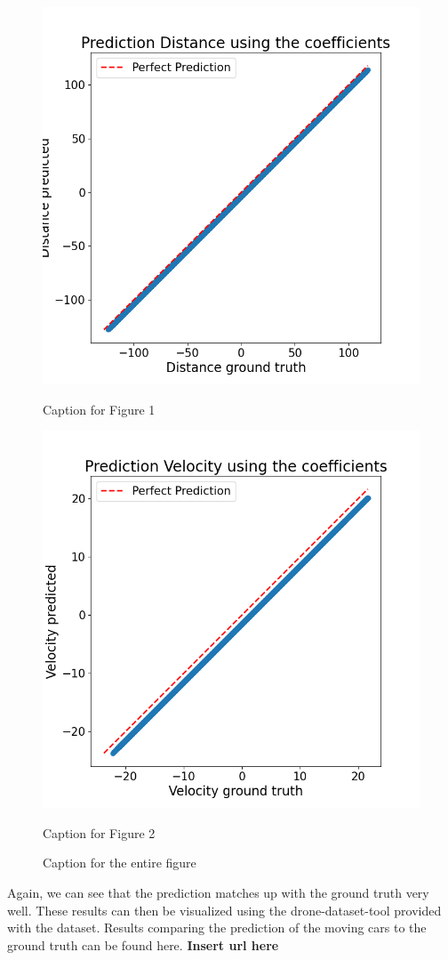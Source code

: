 \begin{figure}[htbp]
    \centering
    \begin{minipage}[b]{0.45\columnwidth}
        \centering
        \includegraphics[width=\columnwidth]{images/figures/Prediction Distance using the coefficients.png}
        \caption{Caption for Figure 1}
        \label{fig:minipage3}
    \end{minipage}
    \hfill
    \begin{minipage}[b]{0.45\columnwidth}
        \centering
        \includegraphics[width=\columnwidth]{images/figures/Prediction Velocity using the coefficients.png}
        \caption{Caption for Figure 2}
        \label{fig:minipage4}
    \end{minipage}
    \caption{Caption for the entire figure}
    \label{fig:combined_figure_2}
\end{figure}

Again, we can see that the prediction matches up with the ground truth very well. 
These results can then be visualized using the drone-dataset-tool provided with the dataset.
Results comparing the prediction of the moving cars to the ground truth can be found here.
\textbf{Insert url here}
